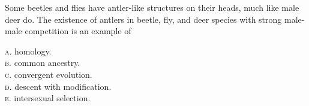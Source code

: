 \documentclass[letterpaper]{tufte-handout}
\begin{document}
\bigskip

\noindent Some beetles and flies have antler-like structures on their heads, much like male deer do. The existence of antlers in beetle, fly, and deer species with strong male-male competition is an example of 


\smallskip

\textsc{a}. homology.\\
\textsc{b}. common ancestry. \\
\textsc{c}. convergent evolution. \\
\textsc{d}. descent with modification. \\
\textsc{e}. intersexual selection.
\end{document}
